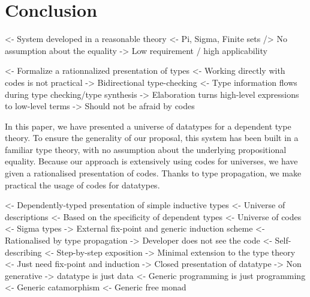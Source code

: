 \documentclass[preprint
              , authoryear
              ]{sigplanconf}
\newenvironment{wstructure}{\comment}{\endcomment}
\begin{document}









\section{Conclusion}

\begin{wstructure}
<- System developed in a reasonable theory
    <- Pi, Sigma, Finite sets
    /> No assumption about the equality
    -> Low requirement / high applicability
\end{wstructure}

\begin{wstructure}
<- Formalize a rationnalized presentation of types
    <- Working directly with codes is not practical
    -> Bidirectional type-checking
        <- Type information flows during type checking/type synthesis
        -> Elaboration turns high-level expressions to low-level terms
    -> Should not be afraid by codes
\end{wstructure}

In this paper, we have presented a universe of datatypes for a
dependent type theory. To ensure the generality of our proposal, this
system has been built in a familiar type theory, with no assumption
about the underlying propositional equality. Because our approach is
extensively using codes for universes, we have given a rationalised
presentation of codes. Thanks to type propagation, we make practical
the usage of codes for datatypes.

\begin{wstructure}
<- Dependently-typed presentation of simple inductive types
    <- Universe of descriptions
        <- Based on the specificity of dependent types
            <- Universe of codes
            <- Sigma types
        -> External fix-point and generic induction scheme
    <- Rationalised by type propagation
        -> Developer does not see the code
    <- Self-describing
        <- Step-by-step exposition
        -> Minimal extension to the type theory
            <- Just need fix-point and induction
        -> Closed presentation of datatype
            -> Non generative
        -> datatype is just data
    <- Generic programming is just programming
        <- Generic catamorphism
        <- Generic free monad
\end{wstructure}
\end{document}
